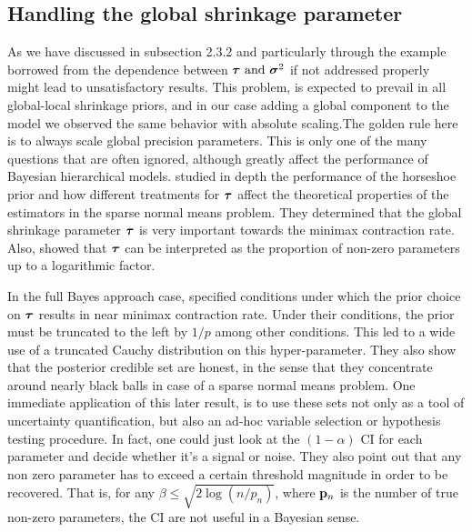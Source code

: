 \documentclass[10pt]{article}
\begin{document}
\subsection{Handling the global shrinkage parameter}

As we have discussed in subsection 2.3.2 and particularly through the example borrowed from \cite{polson2010shrink} the dependence between $\boldsymbol{\tau} \text{ and } \boldsymbol{\sigma}^{2}$ if not addressed properly might lead to unsatisfactory results. This problem, is expected to prevail in all global-local shrinkage priors, and in our case adding a global component to the model we observed the same behavior with absolute scaling.The golden rule here is to always scale global precision parameters. This is only one of the many questions that are often ignored, although greatly affect the performance of Bayesian hierarchical models. \cite{van2017adaptive} studied in depth the performance of the horseshoe prior and how different treatments for $\boldsymbol{\tau}$ affect the theoretical properties of the estimators in the sparse normal means problem. They determined that the global shrinkage parameter $\boldsymbol{\tau}$ is very important towards the minimax contraction rate. Also, \cite{van2014horseshoe} showed that $\boldsymbol{\tau}$ can be interpreted as the proportion of non-zero parameters up to a logarithmic factor.

In the full Bayes approach case, \cite{van2017adaptive} specified conditions under which the prior choice on $\boldsymbol{\tau}$ results in near minimax contraction rate. Under their conditions, the prior must be truncated to the left by $1/p$ among other conditions. This led to a wide use of a truncated Cauchy distribution on this hyper-parameter. They also show that the posterior credible set are honest, in the sense that they concentrate around nearly black balls in case of a sparse normal means problem. One immediate application of this later result, is to use these sets not only as a tool of uncertainty quantification, but also an ad-hoc variable selection or hypothesis testing procedure. In fact, one could just look at the $(1-\alpha)$ \rm{CI} for each parameter and decide whether it's a signal or noise. They also point out that any non zero parameter has to exceed a certain threshold magnitude in order to be recovered. That is, for any $\beta \leq  \sqrt{ 2 \log(n/p_n) }$, where ${\bf p}_n$ is the number of true non-zero parameters, the \rm{CI} are not useful in a Bayesian sense.
\end{document}
